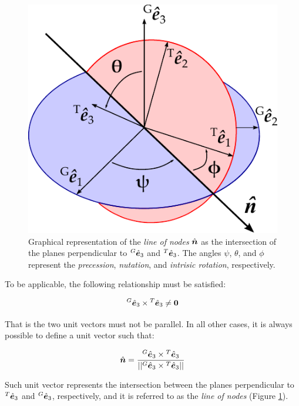 \begin{appendices}
\begin{figure}[ht]
    \centering
    \includegraphics{img/XX_appendices/xx_02.pdf}
    \caption{Graphical representation of the \textit{line of nodes} $\hat{\bm{n}}$ as the intersection of the planes perpendicular to ${^G}{}\hat{\bm{e}}_3$ and ${^T}{}\hat{\bm{e}}_3$. The angles $\psi$, $\theta$, and $\phi$ represent the \textit{precession}, \textit{nutation}, and \textit{intrisic rotation}, respectively.}
    \label{fig:euler_angles_general}
\end{figure}

To be applicable, the following relationship must be satisfied:

\begin{equation}
    {^G}{}\hat{\bm{e}}_{3} \times {^T}{}\hat{\bm{e}}_3 \neq \bm{0}
\end{equation}

That is the two unit vectors must not be parallel. In all other cases, it is always possible to define a unit vector such that:

\begin{equation}
    \hat{\bm{n}} = \frac{{^G}{}\hat{\bm{e}}_3 \times {^T}{}\hat{\bm{e}}_3}{|| {^G}{}\hat{\bm{e}}_3 \times {^T}{}\hat{\bm{e}}_3 ||}
\end{equation}

Such unit vector represents the intersection between the planes perpendicular to ${^T}{}\hat{\bm{e}}_3$ and ${^G}{}\hat{\bm{e}}_3$, respectively, and it is referred to as the \textit{line of nodes} (Figure \ref{fig:euler_angles_general}).


\end{appendices}
